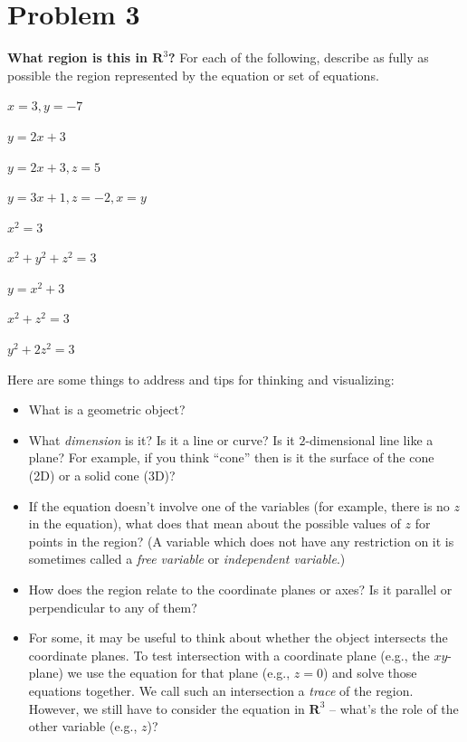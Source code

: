 \documentclass[11pt]{article}
\renewcommand{\R}{\mathbf{R}}
\begin{document}
\section*{Problem 3}
\textbf{What region is this in $\R^3$?} For each of the following, describe as fully as possible the region represented by the equation or set of equations. 
\begin{enum}{\alph}
\item $x=3,y=-7$

\item $y=2x+3$

\item $y=2x+3,z=5$

\item $y=3x+1,z=-2,x=y$

\item $x^2=3$

\item $x^2+y^2+z^2=3$

\item $y=x^2+3$

\item $x^2+z^2=3$

\item $y^2+2z^2=3$
\end{enum}
Here are some things to address and tips for thinking and visualizing:
\begin{itemize}
\item What is a geometric object?

\item What \emph{dimension} is it? Is it a line or curve? Is it $2$-dimensional line like a plane? For example, if you think ``cone'' then is it the surface of the cone (2D) or a solid cone (3D)? 

\item If the equation doesn't involve one of the variables (for example, there is no $z$ in the equation), what does that mean about the possible values of $z$ for points in the region? (A variable which does not have any restriction on it is sometimes called a \emph{free variable} or \emph{independent variable}.)

\item How does the region relate to the coordinate planes or axes? Is it parallel or perpendicular to any of them?

\item For some, it may be useful to think about whether the object intersects the coordinate planes. To test intersection with a coordinate plane (e.g., the $xy$-plane) we use the equation for that plane (e.g., $z=0$) and solve those equations together. We call such an intersection a \emph{trace} of the region. However, we still have to consider the equation in $\R^3$ -- what's the role of the other variable (e.g., $z$)?
\end{itemize}
\end{document}
